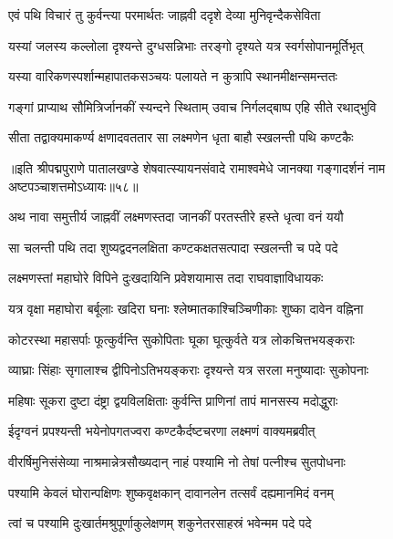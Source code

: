 \twolineshloka
{एवं पथि विचारं तु कुर्वन्त्या परमार्थतः}
{जाह्नवी ददृशे देव्या मुनिवृन्दैकसेविता}%

\twolineshloka
{यस्यां जलस्य कल्लोला दृश्यन्ते दुग्धसन्निभाः}
{तरङ्गो दृश्यते यत्र स्वर्गसोपानमूर्तिभृत्}%

\twolineshloka
{यस्या वारिकणस्पर्शान्महापातकसञ्चयः}
{पलायते न कुत्रापि स्थानमीक्षन्समन्ततः}%

\twolineshloka
{गङ्गां प्राप्याथ सौमित्रिर्जानकीं स्यन्दने स्थिताम्}
{उवाच निर्गलद्बाष्प एहि सीते रथाद्भुवि}%

\twolineshloka
{सीता तद्वाक्यमाकर्ण्य क्षणादवततार सा}
{लक्ष्मणेन धृता बाहौ स्खलन्ती पथि कण्टकैः}%

॥इति श्रीपद्मपुराणे पातालखण्डे शेषवात्स्यायनसंवादे रामाश्वमेधे जानक्या गङ्गादर्शनं नाम अष्टपञ्चाशत्तमोऽध्यायः॥५८॥



\twolineshloka
{अथ नावा समुत्तीर्य जाह्नवीं लक्ष्मणस्तदा}
{जानकीं परतस्तीरे हस्ते धृत्वा वनं ययौ}%

\twolineshloka
{सा चलन्ती पथि तदा शुष्यद्वदनलक्षिता}
{कण्टकक्षतसत्पादा स्खलन्ती च पदे पदे}%

\twolineshloka
{लक्ष्मणस्तां महाघोरे विपिने दुःखदायिनि}
{प्रवेशयामास तदा राघवाज्ञाविधायकः}%

\twolineshloka
{यत्र वृक्षा महाघोरा बर्बूलाः खदिरा घनाः}
{श्लेष्मातकाश्चिञ्चिणीकाः शुष्का दावेन वह्निना}%

\twolineshloka
{कोटरस्था महासर्पाः फूत्कुर्वन्ति सुकोपिताः}
{घूका घूत्कुर्वते यत्र लोकचित्तभयङ्कराः}%

\twolineshloka
{व्याघ्राः सिंहाः सृगालाश्च द्वीपिनोऽतिभयङ्कराः}
{दृश्यन्ते यत्र सरला मनुष्यादाः सुकोपनाः}%

\twolineshloka
{महिषाः सूकरा दुष्टा दंष्ट्रा द्वयविलक्षिताः}
{कुर्वन्ति प्राणिनां तापं मानसस्य मदोद्धुराः}%

\twolineshloka
{ईदृग्वनं प्रपश्यन्ती भयेनोपगतज्वरा}
{कण्टकैर्दष्टचरणा लक्ष्मणं वाक्यमब्रवीत्}%


\twolineshloka
{वीरर्षिमुनिसंसेव्या नाश्रमान्नेत्रसौख्यदान्}
{नाहं पश्यामि नो तेषां पत्नीश्च सुतपोधनाः}%

\twolineshloka
{पश्यामि केवलं घोरान्पक्षिणः शुष्कवृक्षकान्}
{दावानलेन तत्सर्वं दह्यमानमिदं वनम्}%

\twolineshloka
{त्वां च पश्यामि दुःखार्तमश्रुपूर्णाकुलेक्षणम्}
{शकुनेतरसाहस्रं भवेन्मम पदे पदे}%


